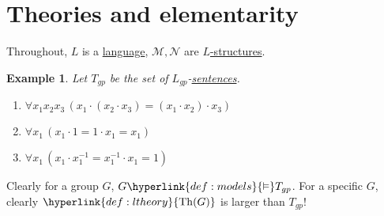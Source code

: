 \documentclass{article}
\let\models\vDash
\DeclareMathOperator{\Mod}{Mod}
\DeclareMathOperator{\Th}{Th}
\newtheorem{nexample}[nthm]{Example}
\begin{document}
\clearpage
\section{Theories and elementarity}
Throughout, $L$ is a \hyperlink{def:lang}{language}, $\mathcal{M}, \mathcal{N}$ are \hyperlink{def:lstr}{$L$-structures}.
\begin{nexample}\label{eg:3.2}
  Let $T_{gp}$ be the set of \hyperlink{def:lgp}{$L_{gp}$}-\hyperlink{def:sentence}{sentences}.
  \begin{enumerate}[label=(\roman*)]
    \item $\forall x_1 x_2 x_3\, (x_1 \cdot (x_2 \cdot x_3) = (x_1 \cdot x_2) \cdot x_3)$
    \item $\forall x_1\, (x_1 \cdot 1 = 1 \cdot x_1 = x_1)$
    \item $\forall x_1\,(x_1 \cdot x_1^{-1} = x_1^{-1} \cdot x_1 = 1)$
  \end{enumerate}
\end{nexample}
Clearly for a group $G$, $G \hyperlink{def:models}{\models} T_{gp}$. For a specific $G$, clearly $\hyperlink{def:ltheory}{\Th(G)}$ is larger than $T_{gp}$!
\end{document}
